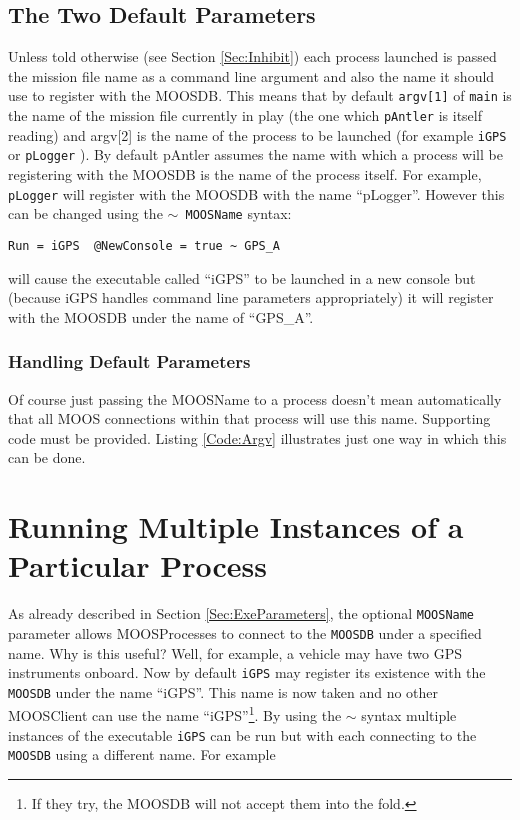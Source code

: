 \documentclass[a4paper,10pt]{article}
\newcommand{\Code}[1]{\texttt{#1} }
\newcommand{\code}[1]{\Code{#1} }
\newcommand{\DB}   {\code{{MOOSDB}}}
\begin{document}
\subsection{The Two Default Parameters}
Unless told otherwise (see Section \ref{Sec:Inhibit})  each process launched is
passed the mission file name  as a command line argument and also the name it should use to register with the MOOSDB. This means
that by default \code{argv[1]} of \code{main} is the name of the mission file currently in play (the one which \code{pAntler} is itself reading) and argv[2] is the name of the process to be launched (for example \code{iGPS} or \code{pLogger}). By default pAntler assumes the name with which a process will be registering with the MOOSDB is the name of the process itself. For example, \code{pLogger} will register with the MOOSDB with the name ``pLogger''. However this can be changed using the \code{$\sim$ MOOSName} syntax:

\begin{lstlisting}
Run = iGPS  @NewConsole = true ~ GPS_A
\end{lstlisting}

will cause the executable called ``iGPS'' to be launched in a new console but (because iGPS handles command line parameters appropriately) it will register with the MOOSDB under the name of ``GPS\_A''.

\subsubsection{Handling Default Parameters}
Of course just passing the MOOSName to a process doesn't mean automatically that all MOOS connections within that process will use this name. Supporting code must be provided. Listing \ref{Code:Argv} illustrates just one way in which this can be done.






\section{Running Multiple Instances of a Particular Process}

As already described in Section \ref{Sec:ExeParameters}, the optional \code{MOOSName} parameter allows MOOSProcesses to
connect to the \DB under a specified name. Why is this useful? Well, for example, a vehicle
may have two GPS instruments onboard. Now by default \code{iGPS}
may register its existence with the \DB under the name ``iGPS''. This name is now taken and no other MOOSClient can use the name ``iGPS''\footnote{If they try, the MOOSDB will not accept them into the fold.}. By using the $\sim$ syntax multiple instances of the executable \code{iGPS} can be run but with each connecting to the \DB using a different name. For example
\end{document}
